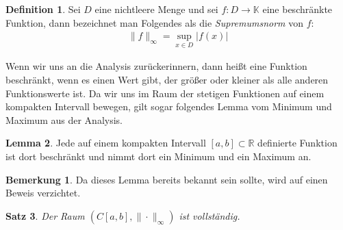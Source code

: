 \documentclass[10pt,a4paper]{article}
\theoremstyle{plain}
\newtheorem{satz}{Satz}[section]
\newenvironment{sa}{\begin{shaded}\begin{satz}}{\end{satz}\end{shaded}}
\theoremstyle{definition}
\newtheorem{definition}[satz]{Definition}
\newenvironment{dfi}{\begin{shaded}\begin{definition}}{\end{definition}\end{shaded}}
\newtheorem{lemma}[satz]{Lemma}
\newenvironment{lem}{\begin{shaded}\begin{lemma}}{\end{lemma}\end{shaded}}
\theoremstyle{nonumberplain}
\newtheorem{bemerkung}{Bemerkung}
\newenvironment{bem}{\begin{bemerkung}}{\end{bemerkung}}
\newcommand{\R}{\mathbb{R}}
\newcommand{\K}{\mathbb{K}}
\begin{document}
\begin{dfi}
Sei $D$ eine nichtleere Menge und sei $f : D \rightarrow \K$ eine beschränkte Funktion, dann bezeichnet man Folgendes als die \textit{Supremumsnorm} von $f$:
\begin{align*}
\|f\|_\infty = \sup_{x \in D}{|f(x)|}
\end{align*}
\end{dfi}
Wenn wir uns an die Analysis zurückerinnern, dann heißt eine Funktion beschränkt, wenn es einen Wert gibt, der größer oder kleiner als alle anderen Funktionswerte ist. Da wir uns im Raum der stetigen Funktionen auf einem kompakten Intervall bewegen, gilt sogar folgendes Lemma vom Minimum und Maximum aus der Analysis.
\begin{lem}
\label{besch}
Jede auf einem kompakten Intervall $[a,b] \subset \R$ definierte Funktion ist dort beschränkt und nimmt dort ein Minimum und ein Maximum an.
\end{lem}
\begin{bem}
Da dieses Lemma bereits bekannt sein sollte, wird auf einen Beweis verzichtet.
\end{bem}
\begin{sa}
Der Raum $(C[a,b], \|\cdot\|_\infty)$ ist vollständig.
\end{sa}
\end{document}

